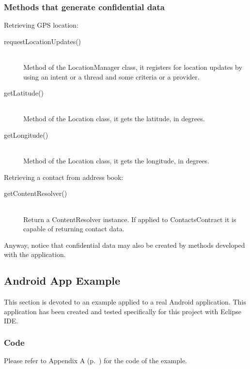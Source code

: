 \documentclass[letterpaper,twocolumn,10pt]{article}
\begin{document}
\subsubsection{Methods that generate confidential data}
\noindent Retrieving GPS location:
\begin{description}
\item[{requestLocationUpdates()}] \hfill \\Method of the LocationManager class, it registers for location updates by using an intent or a thread and some criteria or a provider.
\item[{getLatitude()}] \hfill \\Method of the Location class, it gets the latitude, in degrees.
\item[{getLongitude()}] \hfill \\Method of the Location class, it gets the longitude, in degrees.
\end{description}

\noindent Retrieving a contact from address book:
\begin{description}
\item[{getContentResolver()}] \hfill \\Return a ContentResolver instance. If applied to ContactsContract it is capable of returning contact data.
\end{description}

Anyway, notice that confidential data may also be created by methods developed with the application.



\subsection{Android App Example}
\paragraph{}
This section is devoted to an example applied to a real Android application. This application has been created and tested specifically for this project with Eclipse IDE.

\subsubsection{Code}
Please refer to Appendix A (p.~\pageref{app:appendixA}) for the code of the example.
\end{document}
